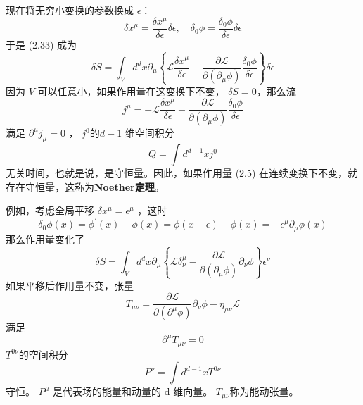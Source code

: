 现在将无穷小变换的参数换成 $\epsilon $：
$$
	\delta x^{\mu}=\frac{\delta x^{\mu}}{\delta \epsilon} \delta \epsilon, \quad \delta_{0} \phi=\frac{\delta_{0} \phi}{\delta \epsilon} \delta \epsilon
$$
于是 (2.33) 成为
\begin{equation}
		\delta S=\int_{V} d^{d} x \partial_{\mu}\left\{\mathcal{L} \frac{\delta x^{\mu}}{\delta \epsilon}+\frac{\partial \mathcal{L}}{\partial\left(\partial_{\mu} \phi\right)} \frac{\delta_{0} \phi}{\delta \epsilon}\right\} \delta \epsilon
\end{equation}
因为 $V$ 可以任意小，如果作用量在这变换下不变， $\delta S=0 $，那么流
\begin{equation}
	j^{\mu}=-\mathcal{L} \frac{\delta x^{\mu}}{\delta \epsilon}-\frac{\partial \mathcal{L}}{\partial\left(\partial_{\mu} \phi\right)} \frac{\delta_{0} \phi}{\delta \epsilon}
\end{equation}
满足 $\partial^\mu j_\mu=0$ ， $j^0 $的$ d-1$ 维空间积分
\begin{equation}
	Q=\int d^{d-1} x j^{0}
\end{equation}
无关时间，也就是说，是守恒量。因此，如果作用量 (2.5) 在连续变换下不变，就存在守恒量，这称为\textbf{Noether定理}。

例如，考虑全局平移 $\delta x^{\mu}=\epsilon^{\mu}$ ，这时
\begin{equation}
	\delta_{0} \phi(x)=\phi^{\prime}(x)-\phi(x)=\phi(x-\epsilon)-\phi(x)=-\epsilon^{\mu} \partial_{\mu} \phi(x)
\end{equation}
那么作用量变化了
\begin{equation}
	\delta S=\int_{V} d^{d} x \partial_{\mu}\left\{\mathcal{L} \delta_{\nu}^{\mu}-\frac{\partial \mathcal{L}}{\partial\left(\partial_{\mu} \phi\right)} \partial_{\nu} \phi\right\} \epsilon^{\nu}
\end{equation}
如果平移后作用量不变，张量
\begin{equation}
	T_{\mu \nu}=\frac{\partial \mathcal{L}}{\partial\left(\partial^{\mu} \phi\right)} \partial_{\nu} \phi-\eta_{\mu \nu} \mathcal{L}
\end{equation}
满足
\begin{equation}
	\partial^{\mu} T_{\mu \nu}=0
\end{equation}
$T^{0\nu} $的空间积分
\begin{equation}
	P^{\nu}=\int d^{d-1} x T^{0 \nu}
\end{equation}
守恒。 $P^\mu$ 是代表场的能量和动量的 d 维向量。 $T_{\mu \nu} $称为能动张量。

